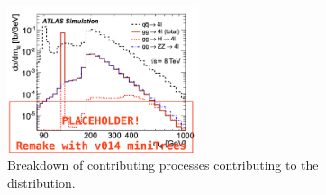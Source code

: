 
\begin{figure}
    \centering
    \includegraphics[width=0.5\textwidth]{Figures/m4l/m4lbreakdown.png}
    \caption{Breakdown of contributing processes contributing to the \mFourL{} distribution.}
    \label{fig:m4lbreakdown}
\end{figure}

